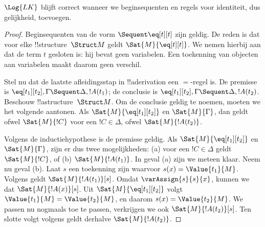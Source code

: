 \documentclass[../../../include/open-logic-section]{subfiles}
\begin{document}


\begin{prop}
$\Log{LK}$ blijft correct wanneer we beginsequenten en regels voor
identiteit, dus gelijkheid, toevoegen.
\end{prop}

\begin{proof}
Beginsequenten van de vorm ${} \Sequent \eq[t][t]$ zijn geldig. De
reden is dat voor elke !!{structure}~$\Struct M$ geldt
$\Sat{M}{\eq[t][t]}$. We nemen hierbij aan dat de term $t$ gesloten is:
hij bevat geen variabelen. Een toekenning van objecten aan variabelen
maakt daarom geen verschil.

Stel nu dat de laatste afleidingsstap in !!a{derivation} een $=$-regel
is. De premisse is $\eq[t_1][t_2], \Gamma \Sequent \Delta, !A(t_1)$;
de conclusie is $\eq[t_1][t_2], \Gamma \Sequent \Delta, !A(t_2)$.
Beschouw !!a{structure}~$\Struct M$. Om de conclusie geldig te noemen,
moeten we het volgende aantonen. Als $\Sat{M}{\eq[t_1][t_2]}$ en
$\Sat{M}{\Gamma}$, dan geldt ofwel $\Sat{M}{!C}$ voor een $!C \in
\Delta$, ofwel $\Sat{M}{!A(t_2)}$.

Volgens de inductiehypothese is de premisse geldig. Als
$\Sat{M}{\eq[t_1][t_2]}$ en $\Sat{M}{\Gamma}$, zijn er dus twee
mogelijkheden: (a) voor een $!C \in \Delta$ geldt $\Sat{M}{!C}$, of
(b) $\Sat{M}{!A(t_1)}$. In geval (a) zijn we meteen klaar. Neem nu
geval (b). Laat $s$ een toekenning zijn waarvoor
$s(x) = \Value{t_1}{M}$. Volgens
 geldt
$\Sat{M}{!A(t_1)}[s]$. Omdat $\varAssign{s}{s}{x}$, kunnen we
 dat $\Sat{M}{!A(x)}[s]$. Uit
$\Sat{M}{\eq[t_1][t_2]}$ volgt $\Value{t_1}{M} = \Value{t_2}{M}$, en
daarom $s(x) = \Value{t_2}{M}$. We passen nu
 nogmaals toe te passen, verkrijgen
we ook $\Sat{M}{!A(t_2)}[s]$. Ten slotte volgt volgens
 geldt derhalve
$\Sat{M}{!A(t_2)}$.
\end{proof}
\end{document}
